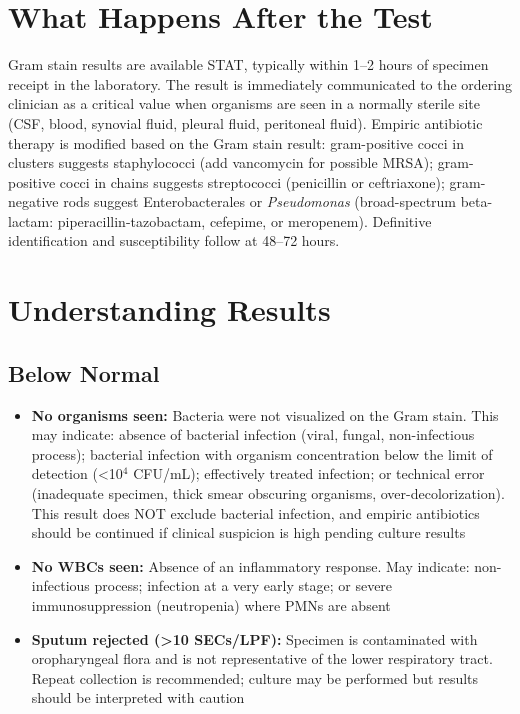 \section*{What Happens After the Test}
Gram stain results are available STAT, typically within 1--2 hours of specimen receipt in the laboratory. The result is immediately communicated to the ordering clinician as a critical value when organisms are seen in a normally sterile site (CSF, blood, synovial fluid, pleural fluid, peritoneal fluid). Empiric antibiotic therapy is modified based on the Gram stain result: gram-positive cocci in clusters suggests staphylococci (add vancomycin for possible MRSA); gram-positive cocci in chains suggests streptococci (penicillin or ceftriaxone); gram-negative rods suggest Enterobacterales or \textit{Pseudomonas} (broad-spectrum beta-lactam: piperacillin-tazobactam, cefepime, or meropenem). Definitive identification and susceptibility follow at 48--72 hours.

\section*{Understanding Results}

\subsection*{Below Normal}
\begin{itemize}
  \item \textbf{No organisms seen:} Bacteria were not visualized on the Gram stain. This may indicate: absence of bacterial infection (viral, fungal, non-infectious process); bacterial infection with organism concentration below the limit of detection (<10$^{4}$ CFU/mL); effectively treated infection; or technical error (inadequate specimen, thick smear obscuring organisms, over-decolorization). This result does NOT exclude bacterial infection, and empiric antibiotics should be continued if clinical suspicion is high pending culture results
  \item \textbf{No WBCs seen:} Absence of an inflammatory response. May indicate: non-infectious process; infection at a very early stage; or severe immunosuppression (neutropenia) where PMNs are absent
  \item \textbf{Sputum rejected (>10 SECs/LPF):} Specimen is contaminated with oropharyngeal flora and is not representative of the lower respiratory tract. Repeat collection is recommended; culture may be performed but results should be interpreted with caution
\end{itemize}

